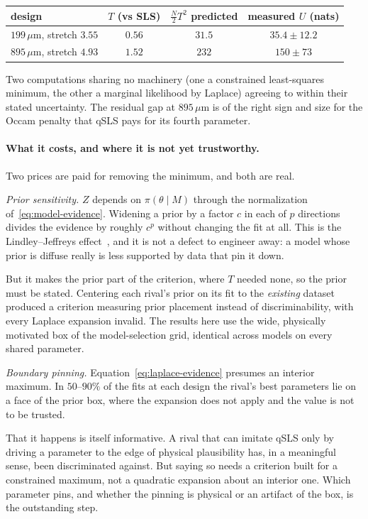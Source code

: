 \documentclass[10pt]{article}
\begin{document}
\begin{center}
\begin{tabular}{lccc}
\toprule
design & $T$ (vs SLS) & $\tfrac{N}{2}T^2$ predicted & measured $U$ (nats) \\
\midrule
$199\,\mu$m, stretch $3.55$ & $0.56$ & $31.5$ & $35.4 \pm 12.2$ \\
$895\,\mu$m, stretch $4.93$ & $1.52$ & $232$ & $150 \pm 73$ \\
\bottomrule
\end{tabular}
\end{center}

Two computations sharing no machinery (one a constrained least-squares minimum, the other
a marginal likelihood by Laplace) agreeing to within their stated uncertainty. The residual
gap at $895\,\mu$m is of the right sign and size for the Occam penalty that qSLS pays for its
fourth parameter.

\paragraph{What it costs, and where it is not yet trustworthy.}
Two prices are paid for removing the minimum, and both are real.

\emph{Prior sensitivity.} $Z$ depends on $\pi(\theta\mid M)$ through the normalization
of~\eqref{eq:model-evidence}. Widening a prior by a factor $c$ in each of $p$ directions
divides the evidence by roughly $c^{p}$ without changing the fit at all. This is the
Lindley--Jeffreys effect~\citep{lindley1957statistical,jeffreys1935some}, and it is not a
defect to engineer away: a model whose prior is diffuse really is less supported by data that
pin it down.

But it makes the prior part of the criterion, where $T$ needed none, so the prior must be
stated. Centering each rival's prior on its fit to the \emph{existing} dataset produced a
criterion measuring prior placement instead of discriminability, with every Laplace expansion
invalid. The results here use the wide, physically motivated box of the model-selection grid,
identical across models on every shared parameter.

\emph{Boundary pinning.} Equation~\eqref{eq:laplace-evidence} presumes an interior maximum. In
$50$--$90\%$ of the fits at each design the rival's best parameters lie on a face of the prior
box, where the expansion does not apply and the value is not to be trusted.

That it happens is itself informative. A rival that can imitate qSLS only by driving a
parameter to the edge of physical plausibility has, in a meaningful sense, been discriminated
against. But saying so needs a criterion built for a constrained maximum, not a quadratic
expansion about an interior one. Which parameter pins, and whether the pinning is physical or
an artifact of the box, is the outstanding step.
\end{document}
